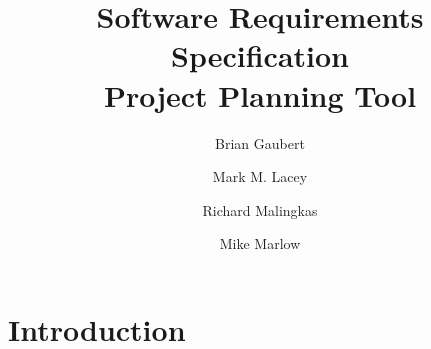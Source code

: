 

\newcommand{\tiscreen}{{\em task information screen}}
\newcommand{\pscreen}{{\em project screen}}
\newcommand{\pcscreen}{{\em PERT chart screen}}
\newcommand{\gcscreen}{{\em Gantt chart screen}}
\newcommand{\poscreen}{{\em export options screen}}
\newcommand{\flsscreen}{{\em file load-store screen}}

\newcommand{\xplan}{{\em xplan}}

\title{Software Requirements Specification\\[.5in]Project Planning Tool}

\author{Brian Gaubert \and Mark M. Lacey \and Richard Malingkas \and
Mike Marlow}



\maketitle


\tableofcontents      %
\newpage              %

\listoffigures        %
\newpage              %


%
%
\section{Introduction}

